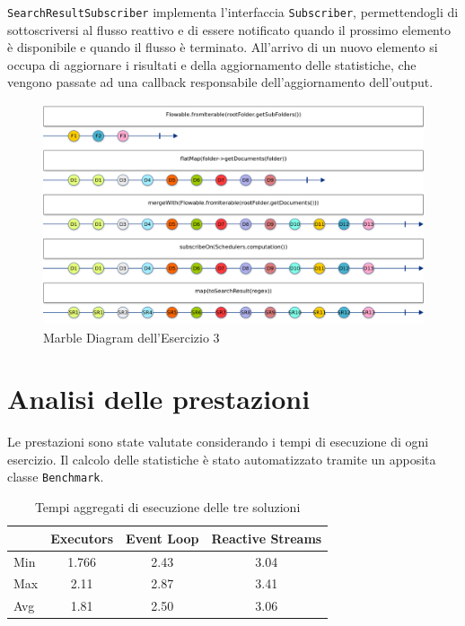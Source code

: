 \documentclass[a4paper]{article}
\begin{document}
\texttt{SearchResultSubscriber} implementa l'interfaccia \texttt{Subscriber}, permettendogli di sottoscriversi al flusso reattivo e di essere notificato quando il prossimo elemento \`e disponibile e quando il flusso \`e terminato.
%
All'arrivo di un nuovo elemento si occupa di aggiornare i risultati e della aggiornamento delle statistiche, che vengono passate ad una callback responsabile dell'aggiornamento dell'output.

\begin{figure}[H]

    \centering

    \includegraphics[width=\linewidth, height=\textheight,keepaspectratio]{ReactiveStreams}

    \caption{Marble Diagram dell'Esercizio 3}

    \label{fig:event-loop}

\end{figure}

\section{Analisi delle prestazioni}\label{analisi-delle-prestazioni}

Le prestazioni sono state valutate considerando i tempi di esecuzione di ogni esercizio.
%
Il calcolo delle statistiche \`e stato automatizzato tramite un apposita classe \texttt{Benchmark}.

\begin{table}[H]

\centering

\label{my-label}

\begin{tabular}{l|ccc}
\hline
    & Executors & Event Loop & Reactive Streams \\ \hline
Min & 1.766     & 2.43       & 3.04             \\
Max & 2.11      & 2.87       & 3.41             \\
Avg & 1.81      & 2.50       & 3.06             \\ \hline
\end{tabular}

\caption{Tempi aggregati di esecuzione delle tre soluzioni}

\label{Tabella speedup del sistema}

\end{table}

\end{document}
